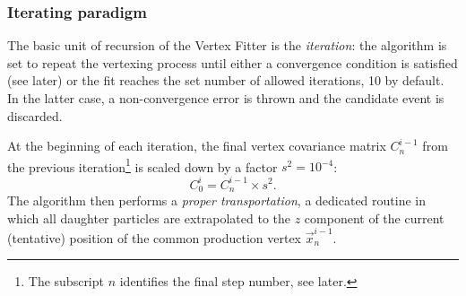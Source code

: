 \subsubsection{Iterating paradigm}
The basic unit of recursion of the Vertex Fitter is the \textit{iteration}:
the algorithm is set to repeat the vertexing process until either a convergence condition is satisfied (see later) or the fit reaches the set number of allowed iterations, 10 by default.
In the latter case, a non-convergence error is thrown and the candidate event is discarded.

At the beginning of each iteration, the final vertex covariance matrix $C^{i-1}_n$ from the previous iteration\footnote{The subscript $n$ identifies the final step number, see later.} is scaled down by a factor $s^2 = {10}^{-4}$:
\begin{equation}
	C^{i}_0 = C^{i-1}_n \times s^2.
\end{equation}
The algorithm then performs a \textit{proper transportation}, a dedicated routine in which all daughter particles are extrapolated to the $z$ component of the current (tentative) position of the common production vertex $\vec{x}_n^{i-1}$.

